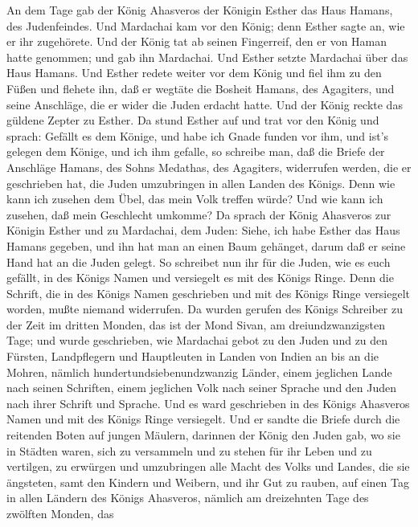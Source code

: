  An dem Tage gab der König Ahasveros der Königin Esther das
Haus Hamans, des Judenfeindes. Und Mardachai kam vor den König; denn
Esther sagte an, wie er ihr zugehörete.  Und der König tat
ab seinen Fingerreif, den er von Haman hatte genommen; und gab ihn
Mardachai. Und Esther setzte Mardachai über das Haus Hamans.
 Und Esther redete weiter vor dem König und fiel ihm zu den
Füßen und flehete ihn, daß er wegtäte die Bosheit Hamans, des Agagiters,
und seine Anschläge, die er wider die Juden erdacht hatte. 
Und der König reckte das güldene Zepter zu Esther. Da stund Esther auf
und trat vor den König  und sprach: Gefällt es dem Könige,
und habe ich Gnade funden vor ihm, und ist's gelegen dem Könige, und ich
ihm gefalle, so schreibe man, daß die Briefe der Anschläge Hamans, des
Sohns Medathas, des Agagiters, widerrufen werden, die er geschrieben
hat, die Juden umzubringen in allen Landen des Königs.  Denn
wie kann ich zusehen dem Übel, das mein Volk treffen würde? Und wie kann
ich zusehen, daß mein Geschlecht umkomme?  Da sprach der
König Ahasveros zur Königin Esther und zu Mardachai, dem Juden: Siehe,
ich habe Esther das Haus Hamans gegeben, und ihn hat man an einen Baum
gehänget, darum daß er seine Hand hat an die Juden gelegt. 
So schreibet nun ihr für die Juden, wie es euch gefällt, in des Königs
Namen und versiegelt es mit des Königs Ringe. Denn die Schrift, die in
des Königs Namen geschrieben und mit des Königs Ringe versiegelt worden,
mußte niemand widerrufen.  Da wurden gerufen des Königs
Schreiber zu der Zeit im dritten Monden, das ist der Mond Sivan, am
dreiundzwanzigsten Tage; und wurde geschrieben, wie Mardachai gebot zu
den Juden und zu den Fürsten, Landpflegern und Hauptleuten in Landen von
Indien an bis an die Mohren, nämlich hundertundsiebenundzwanzig Länder,
einem jeglichen Lande nach seinen Schriften, einem jeglichen Volk nach
seiner Sprache und den Juden nach ihrer Schrift und Sprache.
 Und es ward geschrieben in des Königs Ahasveros Namen und
mit des Königs Ringe versiegelt. Und er sandte die Briefe durch die
reitenden Boten auf jungen Mäulern,  darinnen der König den
Juden gab, wo sie in Städten waren, sich zu versammeln und zu stehen für
ihr Leben und zu vertilgen, zu erwürgen und umzubringen alle Macht des
Volks und Landes, die sie ängsteten, samt den Kindern und Weibern, und
ihr Gut zu rauben,  auf einen Tag in allen Ländern des
Königs Ahasveros, nämlich am dreizehnten Tage des zwölften Monden, das
